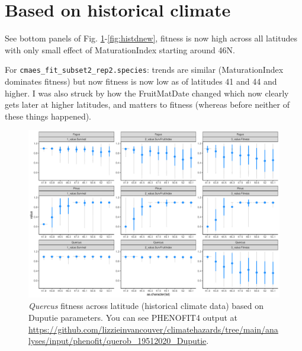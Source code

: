 \documentclass[11pt,letter]{article}
\begin{document}
\section*{Based on historical climate}

See bottom panels of Fig. \ref{fig:histdup}-\ref{fig:histdnew}, fitness is now high across all latitudes with only small effect of MaturationIndex starting around 46\degree N.

For \verb|cmaes_fit_subset2_rep2.species|: trends are similar (MaturationIndex dominates fitness) but now fitness is now low as of latitudes 41 and 44 and higher. I was also struck by how the FruitMatDate changed which now clearly gets later at higher latitudes, and matters to fitness (whereas before neither of these things happened). %

\begin{figure}[h!]
 \begin{center}
\noindent \includegraphics[width=1\textwidth]{..//analyses/graphs/phenofit/historical/fitnessBuildup_DuputieQuercus.pdf}
  \caption{\emph{Quercus} fitness across latitude (historical climate data) based on Duputie parameters. You can see PHENOFIT4 output at \url{https://github.com/lizzieinvancouver/climatehazards/tree/main/analyses/input/phenofit/querob_19512020_Duputie}.}
  \label{fig:histdup}
  \end{center}
\end{figure}
\end{document}
